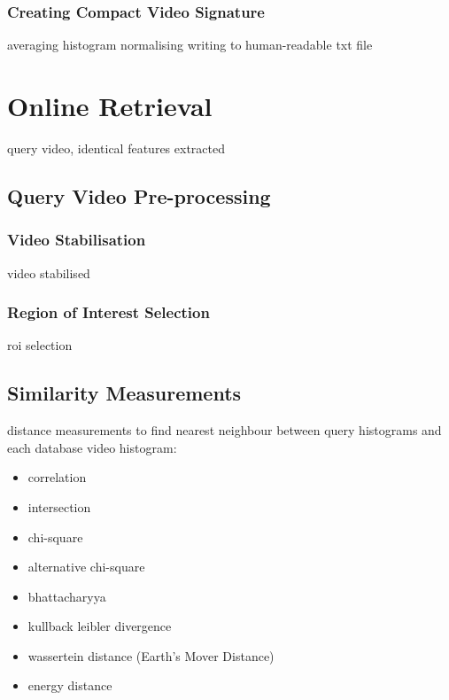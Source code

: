 \subsubsection{Creating Compact Video Signature}

averaging histogram
normalising
writing to human-readable txt file

\section{Online Retrieval}

query video, identical features extracted

\subsection{Query Video Pre-processing}

\subsubsection{Video Stabilisation}

video stabilised

\subsubsection{Region of Interest Selection}

roi selection

\subsection{Similarity Measurements}

distance measurements to find nearest neighbour between query histograms and each database video histogram:

\begin{itemize}
    \item correlation
    \item intersection
    \item chi-square
    \item alternative chi-square
    \item bhattacharyya
    \item kullback leibler divergence
    \item wassertein distance (Earth's Mover Distance)
    \item energy distance
\end{itemize}

